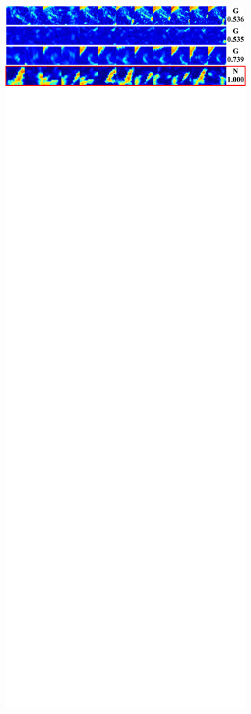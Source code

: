 \documentclass[onecolumn]{IEEEtran}
\begin{document}
\begin{figure}[H]
{\includegraphics[width=0.45\columnwidth]{./images/elcap-mscolornodules-ggo1}
}
\end{figure}

\newpage
\end{document}
